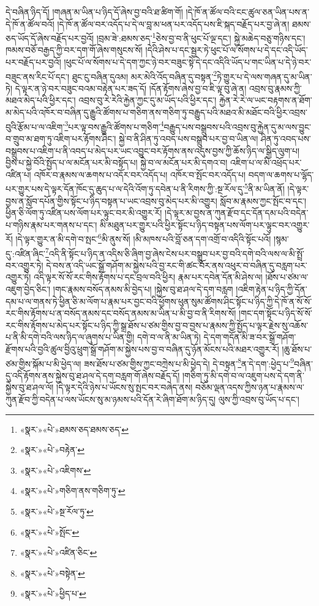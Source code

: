 དེ་བཞིན་ཉིད་དོ། །གཞན་མ་ཡིན་པ་ཉིད་དོ་ཞེས་བྱ་བའི་ཐ་ཚིག་གོ། །དེ་ཁོ་ན་ཚོལ་བའི་ངང་ཚུལ་ཅན་ཡིན་པས་ན་དེ་ཁོ་ན་ཚོལ་བའོ། །དེ་ཁོ་ན་ཚོལ་བར་འདོད་པ་དེ་ལ་བླ་མ་ཕན་པར་འདོད་པས་ཇི་སྐད་བརྗོད་པར་བྱ་ཞེ་ན། ཐམས་ཅད་ཡོད་དོ་ཞེས་བརྗོད་པར་བྱའོ། །བྲམ་ཟེ་:ཐམས་ཅད་\footnote{«སྣར་»«པེ་»ཐམས་ཅད་ཐམས་ཅད་}ཅེས་བྱ་བ་ནི་ཕུང་པོ་ལྔ་དང་། སྐྱེ་མཆེད་བཅུ་གཉིས་དང་། ཁམས་བཅོ་བརྒྱད་ཀྱི་བར་དག་གོ་ཞེས་གསུངས་སོ། །དེའི་ཤེས་པ་དང་སྦྱར་ཏེ་ཕུང་པོ་ལ་སོགས་པ་དེ་དང་འདི་ཡོད་པར་བརྗོད་པར་བྱའོ། །ཕུང་པོ་ལ་སོགས་པ་དེ་དག་ཀྱང་ཉེ་བར་བཟུང་སྟེ་དེ་དང་འདིའི་ཡོད་པ་གང་ཡིན་པ་དེ་ཉེ་བར་བཟུང་ནས་རིང་པོ་དང་། ཐུང་ངུ་བཞིན་དུའམ། མར་མེའི་འོད་བཞིན་དུ་བསྟན་\footnote{«སྣར་»«པེ་»བརྟེན་}ཏེ་གྱུར་པ་དེ་ལས་གཞན་དུ་མ་ཡིན་ཏེ། དེ་ལྟར་ན་ཉེ་བར་བཟུང་བའམ་བརྟེན་པར་ཟད་དོ། །དོན་རྟོགས་ཞེས་བྱ་བ་ཇི་ལྟ་བུ་ཞེ་ན། འབྲས་བུ་རྣམས་ཀྱི་མཐའ་མེད་པའི་ཕྱིར་དང་། འབྲས་བུ་རེ་རེའི་རྐྱེན་ཀྱང་དུ་མ་ཡོད་པའི་ཕྱིར་དང་། རྐྱེན་རེ་རེ་ལ་ཡང་བརྟགས་ན་ཐོག་མ་མེད་པའི་འཁོར་བ་བཞིན་དུ་རྒྱུའི་ཚོགས་པ་གཅིག་ནས་གཅིག་ཏུ་བརྒྱུད་པའི་མཐའ་མི་མཐོང་བའི་ཕྱིར་འབྲས་བུའི་རྩོམ་པ་ལ་འཇིག་\footnote{«སྣར་»«པེ་»འཇིགས་}པར་ལྟ་བས་རྒྱུའི་ཚོགས་པ་གཅིག་\footnote{«སྣར་»«པེ་»གཅིག་ནས་གཅིག་ཏུ་}བརྒྱུད་པས་བསྒྲུབས་པའི་འབྲས་བུ་རྐྱེན་དུ་མ་ལས་བྱུང་བ་གྲུབ་མ་ཐག་ཏུ་འཇིག་པར་རྟོགས་ཤིང་། སྐྱེ་བ་ནི་ཤིན་ཏུ་འབད་པས་བསྒྲུབ་པར་བྱ་བ་ཡིན་ལ། ཤིན་ཏུ་འབད་པས་བསྒྲུབས་པ་འཇིག་པ་ནི་འབད་པ་མེད་པར་ཡང་འབྱུང་བར་རྟོགས་ནས་འདུས་བྱས་ཀྱི་ཆོས་ཉིད་ལ་སྒྱིད་ལུག་པ། བྱིས་པ་སྐྱེ་བོའི་སྤྱོད་པ་ལ་མངོན་པར་མི་བསྟོད་པ། སྐྱེ་བ་ལ་མངོན་པར་མི་དགའ་བ། འཇིག་པ་ལ་མི་འཕྲོད་པར་འཛིན་པ། འཁོར་བ་རྣམས་ལ་ཆགས་པ་འདོར་བར་འདོད་པ། འཁོར་བ་སྤོང་བར་འདོད་པ། བདག་ལ་ཆགས་པ་ལྷོད་པར་གྱུར་པས་དེ་ལྟར་དོན་ཁོང་དུ་ཆུད་པ་ལ་དེའི་འོག་ཏུ་དབེན་པ་ནི་རིགས་ཀྱི་:སྔ་རོལ་དུ་\footnote{«སྣར་»«པེ་»སྔ་རོལ་ཏུ་}ནི་མ་ཡིན་ནོ། །དེ་ལྟར་བྱས་ན་སློབ་དཔོན་གྱིས་སྟོང་པ་ཉིད་བསྟན་པ་ཡང་འབྲས་བུ་མེད་པར་མི་འགྱུར། སློབ་མ་རྣམས་ཀྱང་སྤོང་བ་དང་། ཕྱིན་ཅི་ལོག་ཏུ་འཛིན་པས་ལོག་པར་ལྟུང་བར་མི་འགྱུར་རོ། །དེ་ལྟར་མ་བྱས་ན་ཀུན་རྫོབ་དང་དོན་དམ་པའི་བདེན་པ་གཉིས་རྣམ་པར་གནས་པ་དང་། མི་མཐུན་པར་གྱུར་པའི་ཕྱིར་སྟོང་པ་ཉིད་བསྟན་པས་ལོག་པར་ལྟུང་བར་འགྱུར་རོ། །དེ་ལྟར་གྱུར་ན་མི་དགེ་བ་སྤང་\footnote{«སྣར་»«པེ་»སྤོང་}མི་ནུས་སོ། །མི་མཁས་པའི་བློ་ཅན་དག་འགྲོ་བ་འདིའི་སྟོང་པའོ། །སྙམ་དུ་:འཛིན་ཞིང་\footnote{«སྣར་»«པེ་»འཛིན་ཅིང་}འདི་ནི་སྟོང་པ་ཉིད་ན་འདིས་ཅི་ཞིག་བྱ་ཞེས་ངེས་པར་བསྒྲུབ་པར་བྱ་བའི་དགེ་བའི་ལས་ལ་མི་སྤྲོ་བར་འགྱུར་ཏེ། དེ་བས་ན་འདི་ཡང་སྒྲོ་གཤོག་མ་སྐྱེས་པའི་བྱ་རང་གི་ཚང་བོར་ནས་འཕུར་བ་བཞིན་དུ་བརླག་པར་འགྱུར་ཏེ། འདི་ལྟར་སོ་སོ་རང་གིས་རྟོགས་པ་དང་བྲལ་བའི་ཕྱིར། རྣམ་པར་དབེན་དོན་མི་ཤེས་ལ། །ཐོས་པ་ཙམ་ལ་འཇུག་བྱེད་ཅིང་། །གང་རྣམས་བསོད་ནམས་མི་བྱེད་པ། །སྐྱེས་བུ་ཐ་ཤལ་དེ་དག་བརླག །འཇིག་རྟེན་པ་ཉིད་ཀྱི་དོན་དམ་པ་ལ་གནས་ཏེ་ཕྱིན་ཅི་མ་ལོག་པ་རྣམ་པར་བྱང་བའི་ཕྱོགས་ཕུན་སུམ་ཚོགས་ཤིང་སྟོང་པ་ཉིད་ཀྱི་དེ་ཁོ་ན་སོ་སོ་རང་གིས་རྟོགས་པ་ན་བསོད་ནམས་དང་བསོད་ནམས་མ་ཡིན་པ་མི་བྱ་བ་ནི་རིགས་སོ། །གང་དག་སྟོང་པ་ཉིད་སོ་སོ་རང་གིས་རྟོགས་པ་མེད་པར་སྟོང་པ་ཉིད་ཀྱི་སྒྲ་ཐོས་པ་ཙམ་གྱིས་བྱ་བ་བྱས་པ་རྣམས་ཀྱི་སྤྱོད་པ་ལྟར་རྗེས་སུ་འཆོས་པ་ནི་མི་དགེ་བའི་ལས་ཉིད་ལ་ཞུགས་པ་ཡིན་གྱི། དགེ་བ་ལ་ནི་མ་ཡིན་ཏེ། དེ་དག་གདོན་མི་ཟ་བར་སྒྲོ་གཤོག་རྫོགས་པའི་བྱའི་ཚུལ་བྱིའུ་ཕྲུག་སྒྲོ་གཤོག་མ་སྐྱེས་པས་བྱ་བ་བཞིན་དུ་ཉོན་མོངས་པའི་མཐར་འགྱུར་རོ། །ཆུ་ཐོས་པ་ཙམ་གྱིས་སྐོམ་པ་མི་ཕྱེད་ལ། ཟས་ཐོས་པ་ཙམ་གྱིས་ཀྱང་བཀྲེས་པ་མི་ཕྱེད་དེ། དེ་བསྟན་\footnote{«སྣར་»«པེ་»བསྟེན་}ན་དེ་དག་:ཕྱེད་པ་\footnote{«སྣར་»«པེ་»ཕྱིད་པ་}བཞིན་དུ་འདི་རྟོགས་ནས་སྐྱེས་བུ་ཐ་ཤལ་དེ་དག་བརླག་གོ་ཞེས་བརྗོད་དོ། །གཅིག་ཏུ་མི་དགེ་བ་ལ་འཇུག་པས་དེ་དག་ནི་སྐྱེས་བུ་ཐ་ཤལ་ལོ། །དེ་ལྟར་དེའི་ཉེས་པ་ཡོངས་སུ་སྤང་བར་བཞེད་ནས། བཅོམ་ལྡན་འདས་ཀྱིས་ཉན་པ་རྣམས་ལ་ཀུན་རྫོབ་ཀྱི་བདེན་པ་ལས་ཡོངས་སུ་མ་ཉམས་པའི་དོན་རེ་ཞིག་ཐོག་མ་ཉིད་དུ། ལུས་ཀྱི་འབྲས་བུ་ཡོད་པ་དང་། 